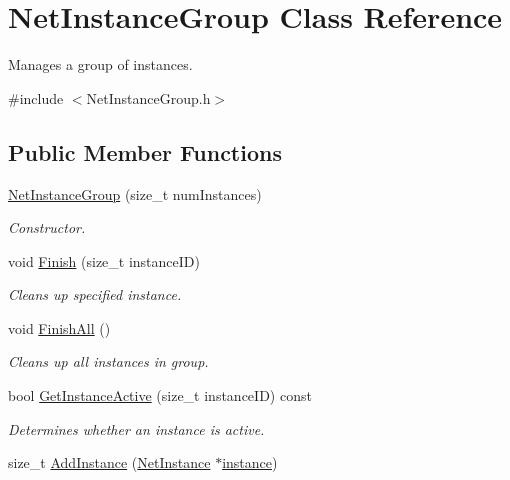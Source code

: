 \hypertarget{class_net_instance_group}{
\section{NetInstanceGroup Class Reference}
\label{class_net_instance_group}
}


Manages a group of instances.  




{\ttfamily \#include $<$NetInstanceGroup.h$>$}

\subsection*{Public Member Functions}
\begin{DoxyCompactItemize}
\item 
\hyperlink{class_net_instance_group_a11f1d2a2e2090736efaea4eb0baaed62}{NetInstanceGroup} (size\_\-t numInstances)
\begin{DoxyCompactList}\small\item\em Constructor. \item\end{DoxyCompactList}\item 
void \hyperlink{class_net_instance_group_ae9f64a65e9d9c889f513ee37aab283bc}{Finish} (size\_\-t instanceID)
\begin{DoxyCompactList}\small\item\em Cleans up specified instance. \item\end{DoxyCompactList}\item 
void \hyperlink{class_net_instance_group_a6618aa432b7973aff44819c719ecb63d}{FinishAll} ()
\begin{DoxyCompactList}\small\item\em Cleans up all instances in group. \item\end{DoxyCompactList}\item 
bool \hyperlink{class_net_instance_group_af6a5f08ff3e912743d9528c9ae4f0c9e}{GetInstanceActive} (size\_\-t instanceID) const 
\begin{DoxyCompactList}\small\item\em Determines whether an instance is active. \item\end{DoxyCompactList}\item 
size\_\-t \hyperlink{class_net_instance_group_a2bfa67bb8ad4e6bfa55eab5ad427b0a1}{AddInstance} (\hyperlink{class_net_instance}{NetInstance} $\ast$\hyperlink{class_net_instance_group_ac5074081fe0e0838a90288cdeebe8eaf}{instance})

\end{DoxyCompactItemize}
